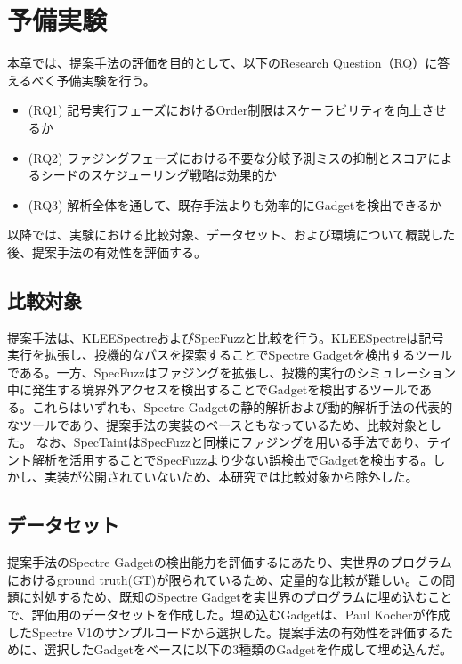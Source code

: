 \section{予備実験}
本章では、提案手法の評価を目的として、以下のResearch Question（RQ）に答えるべく予備実験を行う。\par

\begin{itemize}
  \item (RQ1) 記号実行フェーズにおけるOrder制限はスケーラビリティを向上させるか
  \item (RQ2) ファジングフェーズにおける不要な分岐予測ミスの抑制とスコアによるシードのスケジューリング戦略は効果的か
  \item (RQ3) 解析全体を通して、既存手法\cite{wang2020kleespectre,oleksenko2020specfuzz}よりも効率的にGadgetを検出できるか
\end{itemize}

以降では、実験における比較対象、データセット、および環境について概説した後、提案手法の有効性を評価する。\par

\subsection{比較対象}
提案手法は、KLEESpectre\cite{wang2020kleespectre}およびSpecFuzz\cite{oleksenko2020specfuzz}と比較を行う。KLEESpectreは記号実行を拡張し、投機的なパスを探索することでSpectre Gadgetを検出するツールである。一方、SpecFuzzはファジングを拡張し、投機的実行のシミュレーション中に発生する境界外アクセスを検出することでGadgetを検出するツールである。これらはいずれも、Spectre Gadgetの静的解析および動的解析手法の代表的なツールであり、提案手法の実装のベースともなっているため、比較対象とした。
なお、SpecTaint\cite{qi2021spectaint}はSpecFuzzと同様にファジングを用いる手法であり、テイント解析を活用することでSpecFuzzより少ない誤検出でGadgetを検出する。しかし、実装が公開されていないため、本研究では比較対象から除外した。

\subsection{データセット}
提案手法のSpectre Gadgetの検出能力を評価するにあたり、実世界のプログラムにおけるground truth(GT)が限られているため、定量的な比較が難しい。この問題に対処するため、既知のSpectre Gadgetを実世界のプログラムに埋め込むことで、評価用のデータセットを作成した。埋め込むGadgetは、Paul Kocherが作成したSpectre V1のサンプルコード\cite{spectre-v1-gadget}から選択した。提案手法の有効性を評価するために、選択したGadgetをベースに以下の3種類のGadgetを作成して埋め込んだ。\par

